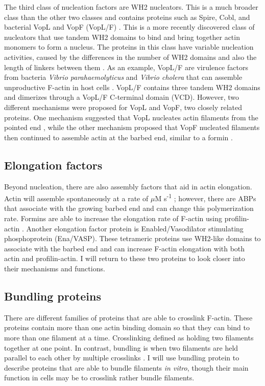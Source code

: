 The third class of nucleation factors are WH2 nucleators. This is a much broader class than the other two classes and contains proteins such as Spire, Cobl, and bacterial VopL and VopF (VopL/F) \citep{quinlan_drosophila_2005, namgoong_mechanism_2011, burke_bacterial_2017,siton-mendelson_functional_2017}. This is a more recently discovered class of nucleators that use tandem WH2 domains to bind and bring together actin monomers to form a nucleus. The proteins in this class have variable nucleation activities, caused by the differences in the number of WH2 domains and also the length of linkers between them \citep{siton-mendelson_functional_2017}. As an example, VopL/F are virulence factors from bacteria \textit{Vibrio parahaemolyticus} and \textit{Vibrio cholera} that can assemble unproductive F-actin in host cells \citep{liverman_arp2/3-independent_2007}. VopL/F contains three tandem WH2 domains and dimerizes through a VopL/F C-terminal domain (VCD). However, two different mechanisms were proposed for VopL and VopF, two closely related proteins. One mechanism suggested that VopL nucleates actin filaments from the pointed end \citep{namgoong_mechanism_2011,yu_mechanism_2011,zahm_bacterial_2013}, while the other mechanism proposed that VopF nucleated filaments then continued to assemble actin at the barbed end, similar to a formin \citep{pernier_dimeric_2013}.

\subsection{Elongation factors}\label{elongators}
Beyond nucleation, there are also assembly factors that aid in actin elongation. Actin will assemble spontaneously at a rate of  $\mu$M s\textsuperscript{-1} \citep{pollard_rate_1986}; however, there are ABPs that associate with the growing barbed end and can change this polymerization rate. Formins are able to increase the elongation rate of F-actin using profilin-actin \citep{pollard_actin_2016}. Another elongation factor protein is Enabled/Vasodilator stimulating phosphoprotein (Ena/VASP). These tetrameric proteins use WH2-like domains to associate with the barbed end and can increase F-actin elongation with both actin and profilin-actin. I will return to these two proteins to look closer into their mechanisms and functions.

\subsection{Bundling proteins}\label{bundlers}
There are different families of proteins that are able to crosslink F-actin. These proteins contain more than one actin binding domain so that they can bind to more than one filament at a time. Crosslinking defined as holding two filaments together at one point. In contrast, bundling is when two filaments are held parallel to each other by multiple crosslinks \citep{pollard_actin_2016}. I will use bundling protein to describe proteins that are able to bundle filaments \textit{in vitro}, though their main function in cells may be to crosslink rather bundle filaments. 

